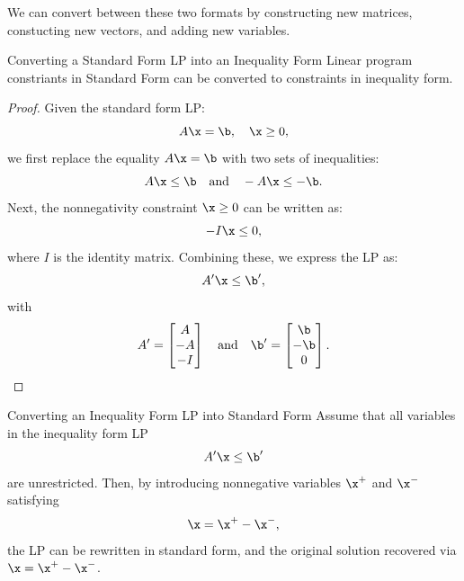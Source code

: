 We can convert between these two formats by constructing new matrices, constucting new vectors, and adding new variables.

\begin{proposition}{Converting a Standard Form LP into an Inequality Form}{}{}
Linear program constriants in Standard Form can be converted to constraints in inequality form.
\end{proposition}
\begin{proof}
Given the standard form LP:
\[
A\x = \b, \quad \x \geq 0,
\]
we first replace the equality \(A\x = \b\) with two sets of inequalities:
\[
A\x \leq\b\quad \text{and} \quad -A\x \leq -\b.
\]
Next, the nonnegativity constraint \(\x \geq 0\) can be written as:
\[
-I\x \leq 0,
\]
where \(I\) is the identity matrix. Combining these, we express the LP as:
\[
A'\x \leq \b',
\]
with
\[
A' = \begin{bmatrix}
A \\
-A \\
-I
\end{bmatrix}
\quad \text{and} \quad
\b' = \begin{bmatrix}
\b \\
-\b \\
0
\end{bmatrix}.
\]
\end{proof}

\begin{proposition}{Converting an Inequality Form LP into Standard Form}{}
Assume that all variables in the inequality form LP
\[
A'\x \le \b'
\]
are unrestricted. Then, by introducing nonnegative variables \(\x^+\) and \(\x^-\) satisfying
\[
\x = \x^+ - \x^-,
\]
the LP can be rewritten in standard form, and the original solution recovered via \(\x = \x^+ - \x^-\).
\end{proposition}

